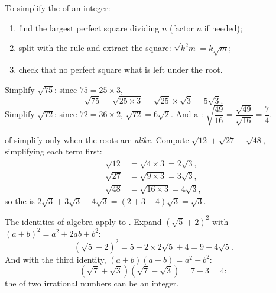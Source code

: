 \begin{method}\label{met:g9:sqrt:simplify}
To simplify the  of an integer:
\begin{enumerate}
  \item find the largest perfect square dividing $n$ (factor $n$ if
        needed);
  \item split with the  rule and extract the square:
        $\sqrt{k^2 m} = k\sqrt m$;
  \item check that no perfect square  what is left under the
        root.
\end{enumerate}
\end{method}

\begin{example}\label{ex:g9:sqrt:simplify}
Simplify $\sqrt{75}$: since $75 = 25 \times 3$,
\[
\sqrt{75} = \sqrt{25 \times 3} = \sqrt{25} \times \sqrt 3 = 5\sqrt3 .
\]
Simplify $\sqrt{72}$: since $72 = 36 \times 2$,
$\sqrt{72} = 6\sqrt2$. And a :
$\sqrt{\dfrac{49}{16}} = \dfrac{\sqrt{49}}{\sqrt{16}} = \dfrac74$.
\end{example}

\begin{example}\label{ex:g9:sqrt:add}
 of  simplify only when the roots are \emph{alike}.
Compute $\sqrt{12} + \sqrt{27} - \sqrt{48}$, simplifying each term first:
\begin{align*}
\sqrt{12} &= \sqrt{4 \times 3} = 2\sqrt3, \\
\sqrt{27} &= \sqrt{9 \times 3} = 3\sqrt3, \\
\sqrt{48} &= \sqrt{16 \times 3} = 4\sqrt3,
\end{align*}
so the  is $2\sqrt3 + 3\sqrt3 - 4\sqrt3 = (2 + 3 - 4)\sqrt3 = \sqrt3$.
\end{example}

\begin{example}\label{ex:g9:sqrt:expand}
The identities of algebra apply to . Expand
$\left(\sqrt5 + 2\right)^2$ with $(a+b)^2 = a^2 + 2ab + b^2$:
\[
\left(\sqrt5 + 2\right)^2 = 5 + 2 \times 2\sqrt5 + 4 = 9 + 4\sqrt5 .
\]
And with the third identity, $(a+b)(a-b) = a^2 - b^2$:
\[
\left(\sqrt7 + \sqrt3\right)\left(\sqrt7 - \sqrt3\right) = 7 - 3 = 4 :
\]
the  of two irrational numbers can be an integer.
\end{example}


